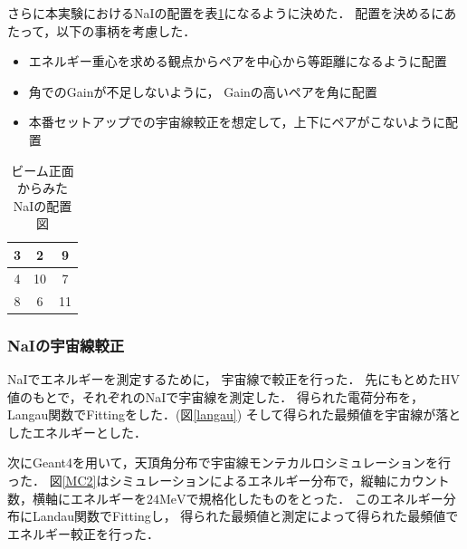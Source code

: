 さらに本実験におけるNaIの配置を表\ref{haichi}になるように決めた．
配置を決めるにあたって，以下の事柄を考慮した．
\begin{itemize}
\item エネルギー重心を求める観点からペアを中心から等距離になるように配置
\item 角でのGainが不足しないように， Gainの高いペアを角に配置%
\item 本番セットアップでの宇宙線較正を想定して，上下にペアがこないように配置%
\end{itemize}
\begin{table}[H]
  \begin{center}
    \caption{ビーム正面からみたNaIの配置図}\label{haichi}
    \begin{tabular}{|c|c|c|}\hline 
      \cellcolor{yellow}3&\cellcolor{red}2&\cellcolor{yellow}9\\ \hline
      \cellcolor{cyan}4&10&\cellcolor{red}7\\ \hline
      \cellcolor{green}8&\cellcolor{cyan}6&\cellcolor{green}11\\ \hline
    \end{tabular}
  \end{center}
\end{table}
\newpage
\subsubsection{NaIの宇宙線較正}
NaIでエネルギーを測定するために， 宇宙線で較正を行った．
先にもとめたHV値のもとで，それぞれのNaIで宇宙線を測定した．%
得られた電荷分布を，Langau関数でFittingをした．(図\ref{langau})
そして得られた最頻値を宇宙線が落としたエネルギーとした．%

次にGeant4を用いて，天頂角分布で宇宙線モンテカルロシミュレーションを行った．
図\ref{MC2}はシミュレーションによるエネルギー分布で，縦軸にカウント数，横軸にエネルギーを$24\mathrm{MeV}$で規格化したものをとった．
このエネルギー分布にLandau関数でFittingし，%
得られた最頻値と測定によって得られた最頻値でエネルギー較正を行った．

